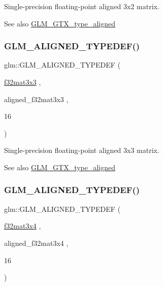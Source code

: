 Single-\/precision floating-\/point aligned 3x2 matrix. \begin{DoxySeeAlso}{See also}
\mbox{\hyperlink{group__gtx__type__aligned}{G\+L\+M\+\_\+\+G\+T\+X\+\_\+type\+\_\+aligned}} 
\end{DoxySeeAlso}
\mbox{\label{group__gtx__type__aligned_ga3f510999e59e1b309113e1d561162b29}} 
\subsubsection{\texorpdfstring{GLM\_ALIGNED\_TYPEDEF()}{GLM\_ALIGNED\_TYPEDEF()}\hspace{0.1cm}{\footnotesize\ttfamily [188/209]}}
{\footnotesize\ttfamily glm\+::\+G\+L\+M\+\_\+\+A\+L\+I\+G\+N\+E\+D\+\_\+\+T\+Y\+P\+E\+D\+EF (\begin{DoxyParamCaption}\item[{\mbox{\hyperlink{group__gtc__type__precision_ga715b36ea1e2d1ffaaef7517cc78b3877}{f32mat3x3}}}]{,  }\item[{aligned\+\_\+f32mat3x3}]{,  }\item[{16}]{ }\end{DoxyParamCaption})}

Single-\/precision floating-\/point aligned 3x3 matrix. \begin{DoxySeeAlso}{See also}
\mbox{\hyperlink{group__gtx__type__aligned}{G\+L\+M\+\_\+\+G\+T\+X\+\_\+type\+\_\+aligned}} 
\end{DoxySeeAlso}
\mbox{\label{group__gtx__type__aligned_ga2c9c94f0c89cd71ce56551db6cf4aaec}} 
\subsubsection{\texorpdfstring{GLM\_ALIGNED\_TYPEDEF()}{GLM\_ALIGNED\_TYPEDEF()}\hspace{0.1cm}{\footnotesize\ttfamily [189/209]}}
{\footnotesize\ttfamily glm\+::\+G\+L\+M\+\_\+\+A\+L\+I\+G\+N\+E\+D\+\_\+\+T\+Y\+P\+E\+D\+EF (\begin{DoxyParamCaption}\item[{\mbox{\hyperlink{group__gtc__type__precision_ga9995b357aa1e9603adad780cfde1aa07}{f32mat3x4}}}]{,  }\item[{aligned\+\_\+f32mat3x4}]{,  }\item[{16}]{ }\end{DoxyParamCaption})}

